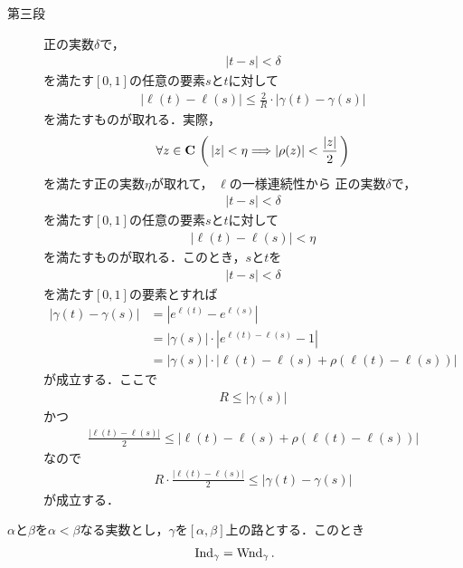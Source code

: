\begin{sketch}
\begin{description}
			\item[第三段]
				正の実数$\delta$で，
				\begin{align}
					|t - s| < \delta
				\end{align}
				を満たす$[0,1]$の任意の要素$s$と$t$に対して
				\begin{align}
					|\ell(t) - \ell(s)| \leq \frac{2}{R} \cdot |\gamma(t) - \gamma(s)|
				\end{align}
				を満たすものが取れる．実際，
				\begin{align}
					\forall z \in \mathbf{C}\,
					\left(\, |z| < \eta \Longrightarrow |\rho(z)| < \frac{|z|}{2}\, \right)
				\end{align}
				を満たす正の実数$\eta$が取れて，
				$\ell$の一様連続性から
				正の実数$\delta$で，
				\begin{align}
					|t - s| < \delta
				\end{align}
				を満たす$[0,1]$の任意の要素$s$と$t$に対して
				\begin{align}
					|\ell(t) - \ell(s)| < \eta
				\end{align}
				を満たすものが取れる．このとき，$s$と$t$を
				\begin{align}
					|t - s| < \delta
				\end{align}
				を満たす$[0,1]$の要素とすれば
				\begin{align}
					|\gamma(t) - \gamma(s)|
					&= \left| e^{\ell(t)} - e^{\ell(s)} \right| \\
					&= |\gamma(s)| \cdot \left| e^{\ell(t) - \ell(s)} - 1 \right| \\
					&= |\gamma(s)| \cdot \left| \ell(t) - \ell(s) + \rho(\ell(t) - \ell(s)) \right|
				\end{align}
				が成立する．ここで
				\begin{align}
					R \leq |\gamma(s)|
				\end{align}
				かつ
				\begin{align}
					\frac{|\ell(t) - \ell(s)|}{2} \leq \left| \ell(t) - \ell(s) + \rho(\ell(t) - \ell(s)) \right|
				\end{align}
				なので
				\begin{align}
					R \cdot \frac{|\ell(t) - \ell(s)|}{2} \leq |\gamma(t) - \gamma(s)|
				\end{align}
				が成立する．
				\QED
		\end{description}
	\end{sketch}
	
	\begin{screen}
		\begin{thm}[路の指数と回転数は一致する]
			$\alpha$と$\beta$を$\alpha < \beta$なる実数とし，$\gamma$を$[\alpha,\beta]$上の路とする．このとき
			\begin{align}
				\operatorname{Ind}_{\gamma} = \operatorname{Wnd}_{\gamma}.
			\end{align}
		\end{thm}
	\end{screen}
	
